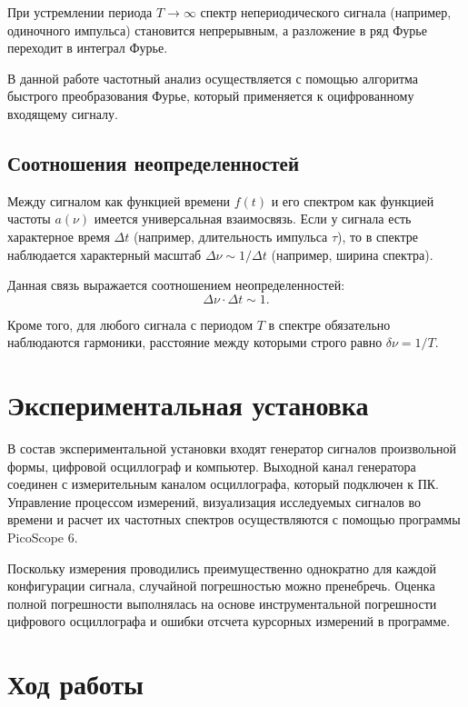 \documentclass[reprint, amsmath, amssymb, aps, pra, nofootinbib]{revtex4-2}
\begin{document}
При устремлении периода $T \to \infty$ спектр непериодического сигнала (например, одиночного импульса) становится непрерывным, а разложение в ряд Фурье переходит в интеграл Фурье.

В данной работе частотный анализ осуществляется с помощью алгоритма быстрого преобразования Фурье, который применяется к оцифрованному входящему сигналу. 

\subsection{Соотношения неопределенностей}

Между сигналом как функцией времени $f(t)$ и его спектром как функцией частоты $a(\nu)$ имеется универсальная взаимосвязь. Если у сигнала есть характерное время $\Delta t$ (например, длительность импульса $\tau$), то в спектре наблюдается характерный масштаб $\Delta \nu \sim 1/\Delta t$ (например, ширина спектра). 

Данная связь выражается соотношением неопределенностей:
\begin{equation}
\Delta \nu \cdot \Delta t \sim 1.
\end{equation}

Кроме того, для любого сигнала с периодом $T$ в спектре обязательно наблюдаются гармоники, расстояние между которыми строго равно $\delta \nu = 1/T$.


\section{Экспериментальная установка}

В состав экспериментальной установки входят генератор сигналов произвольной формы, цифровой осциллограф и компьютер. Выходной канал генератора соединен с измерительным каналом осциллографа, который подключен к ПК. Управление процессом измерений, визуализация исследуемых сигналов во времени и расчет их частотных спектров осуществляются с помощью программы PicoScope 6. 

Поскольку измерения проводились преимущественно однократно для каждой конфигурации сигнала, случайной погрешностью можно пренебречь. Оценка полной погрешности выполнялась на основе инструментальной погрешности цифрового осциллографа и ошибки отсчета курсорных измерений в программе.

\section{Ход работы}
\end{document}
